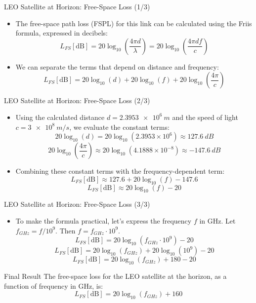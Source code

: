 \documentclass{beamer}
\begin{document}
	\begin{frame}{LEO Satellite at Horizon: Free-Space Loss (1/3)}
		\begin{itemize}
			\item The free-space path loss (FSPL) for this link can be calculated using the Friis formula, expressed in decibels:
			\[ L_{FS}[\text{dB}] = 20 \log_{10}\left(\frac{4\pi d}{\lambda}\right) = 20 \log_{10}\left(\frac{4\pi d f}{c}\right) \]
			\item We can separate the terms that depend on distance and frequency:
			\[ L_{FS}[\text{dB}] = 20 \log_{10}(d) + 20 \log_{10}(f) + 20 \log_{10}\left(\frac{4\pi}{c}\right) \]
		\end{itemize}
	\end{frame}
	
	\begin{frame}{LEO Satellite at Horizon: Free-Space Loss (2/3)}
		\begin{itemize}
			\item Using the calculated distance $d = \SI{2.3953e6}{m}$ and the speed of light $c = \SI{3e8}{m/s}$, we evaluate the constant terms:
			\[ 20 \log_{10}(d) = 20 \log_{10}(2.3953 \times 10^6) \approx \SI{127.6}{dB} \]
			\[ 20 \log_{10}\left(\frac{4\pi}{c}\right) \approx 20 \log_{10}(4.1888 \times 10^{-8}) \approx \SI{-147.6}{dB} \]
			\item Combining these constant terms with the frequency-dependent term:
			\[ L_{FS}[\text{dB}] \approx 127.6 + 20 \log_{10}(f) - 147.6 \]
			\[ L_{FS}[\text{dB}] \approx 20 \log_{10}(f) - 20 \]
		\end{itemize}
	\end{frame}
	
	\begin{frame}{LEO Satellite at Horizon: Free-Space Loss (3/3)}
		\begin{itemize}
			\item To make the formula practical, let's express the frequency $f$ in GHz. Let $f_{GHz} = f / 10^9$. Then $f = f_{GHz} \cdot 10^9$.
			\[ L_{FS}[\text{dB}] = 20 \log_{10}(f_{GHz} \cdot 10^9) - 20 \]
			\[ L_{FS}[\text{dB}] = 20 \log_{10}(f_{GHz}) + 20 \log_{10}(10^9) - 20 \]
			\[ L_{FS}[\text{dB}] = 20 \log_{10}(f_{GHz}) + 180 - 20 \]
		\end{itemize}
		\vspace{-1em}
		\begin{alertblock}{Final Result}
			The free-space loss for the LEO satellite at the horizon, as a function of frequency in GHz, is:
			\[ L_{FS}[\text{dB}] = 20 \log_{10}(f_{GHz}) + 160 \]
		\end{alertblock}
	\end{frame}
	
\end{document}
